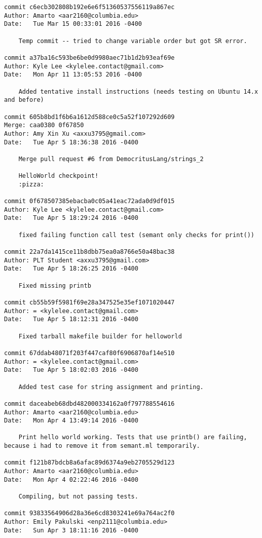 \begin{lstlisting}[backgroundcolor=\color{white}]
commit c6ecb302808b192e6e6f51360537556119a867ec
Author: Amarto <aar2160@columbia.edu>
Date:   Tue Mar 15 00:33:01 2016 -0400

    Temp commit -- tried to change variable order but got SR error.

commit a37ba16c593be6be0d9980aec71b1d2b93eaf69e
Author: Kyle Lee <kylelee.contact@gmail.com>
Date:   Mon Apr 11 13:05:53 2016 -0400

    Added tentative install instructions (needs testing on Ubuntu 14.x and before)

commit 605b8bd1f6b6a1612d588ce0c5a52f107292d609
Merge: caa0380 0f67850
Author: Amy Xin Xu <axxu3795@gmail.com>
Date:   Tue Apr 5 18:36:38 2016 -0400

    Merge pull request #6 from DemocritusLang/strings_2
    
    HelloWorld checkpoint!
    :pizza:

commit 0f678507385ebacba0c05a41eac72ada0d9df015
Author: Kyle Lee <kylelee.contact@gmail.com>
Date:   Tue Apr 5 18:29:24 2016 -0400

    fixed failing function call test (semant only checks for print())

commit 22a7da1415ce11b8dbb75ea0a8766e50a48bac38
Author: PLT Student <axxu3795@gmail.com>
Date:   Tue Apr 5 18:26:25 2016 -0400

    Fixed missing printb

commit cb55b59f5981f69e28a347525e35ef1071020447
Author: = <kylelee.contact@gmail.com>
Date:   Tue Apr 5 18:12:31 2016 -0400

    Fixed tarball makefile builder for helloworld

commit 67ddab48071f203f447caf80f6906870af14e510
Author: = <kylelee.contact@gmail.com>
Date:   Tue Apr 5 18:02:03 2016 -0400

    Added test case for string assignment and printing.

commit daceabeb68dbd482000334162a0f797788554616
Author: Amarto <aar2160@columbia.edu>
Date:   Mon Apr 4 13:49:14 2016 -0400

    Print hello world working. Tests that use printb() are failing, because i had to remove it from semant.ml temporarily.

commit f121b87bdcb8a6afac89d6374a9eb2705529d123
Author: Amarto <aar2160@columbia.edu>
Date:   Mon Apr 4 02:22:46 2016 -0400

    Compiling, but not passing tests.

commit 93833564906d28a36e6cd8303241e69a764ac2f0
Author: Emily Pakulski <enp2111@columbia.edu>
Date:   Sun Apr 3 18:11:16 2016 -0400


\end{lstlisting}

